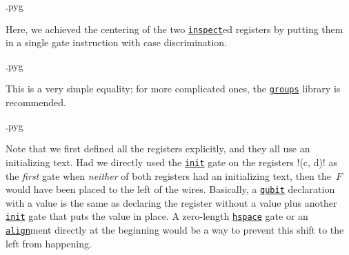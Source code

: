 \documentclass{scrartcl}
\makeatletter
\newenvironment{codeexample}{%
   \VerbatimEnvironment%
   \let\FVB@VerbatimOut\minted@FVB@VerbatimOut
   \let\FVE@VerbatimOut\minted@FVE@VerbatimOut
   \minted@configlang{tex}%
   \minted@fvset
   \begin{VerbatimOut}[codes={\catcode`\^^I=12},firstline,lastline]{\minted@jobname.pyg}%
}{
   \end{VerbatimOut}%
   \minted@langlinenoson%
   \savebox\codeexamplebox{ \minted@jobname.pyg}%
   \ifdim\wd\codeexamplebox>\dimexpr.5\linewidth-3mm\relax%
      \wd\codeexamplebox=.5\linewidth%
   \else%
      \wd\codeexamplebox=\dimexpr\wd\codeexamplebox+3mm\relax%
   \fi%
   \noindent\begin{minipage}{\wd\codeexamplebox}%
      \centering%
      \usebox\codeexamplebox%
   \end{minipage}%
   \begin{minipage}{\dimexpr\linewidth-\wd\codeexamplebox\relax}%
      \expandafter\minted@pygmentize\expandafter{\minted@lang}%
   \end{minipage}%
   \minted@langlinenosoff%
   \par%
}
\def\gate#1{\hyperref[gate:#1]{\texttt{#1}}}
\makeatother
\begin{document}
            \begin{example}
               \begin{codeexample}
               \end{codeexample}
               Here, we achieved the centering of the two \gate{inspect}ed registers by putting them in a single gate instruction with case discrimination.
            \end{example}

            \begin{example}
               \begin{codeexample}
               \end{codeexample}
               This is a very simple equality; for more complicated ones, the \hyperref[sec:foreign:groups]{\texttt{groups}} library is recommended.
            \end{example}

            \begin{example}
               \begin{codeexample}
               \end{codeexample}
               Note that we first defined all the registers explicitly, and they all use an initializing text.
               Had we directly used the \gate{init} gate on the registers \yquant!(c, d)! as the \emph{first} gate when \emph{neither} of both registers had an initializing text, then the~$F$ would have been placed to the left of the wires.
               Basically, a \gate{qubit} declaration with a value is the same as declaring the register without a value plus another \gate{init} gate that puts the value in place.
               A zero\hyp length \gate{hspace} gate or an \gate{align}ment directly at the beginning would be a way to prevent this shift to the left from happening.
            \end{example}
\end{document}
